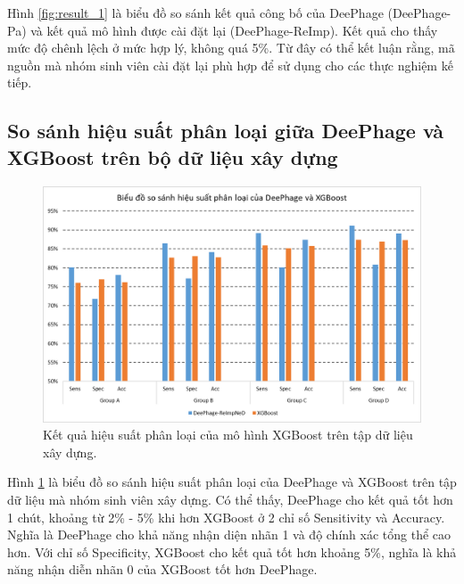 Hình \ref{fig:result_1} là biểu đồ so sánh kết quả công bố của DeePhage (DeePhage-Pa) và kết quả mô hình được cài đặt lại (DeePhage-ReImp). Kết quả cho thấy mức độ chênh lệch ở mức hợp lý, không quá 5\%. Từ đây có thể kết luận rằng, mã nguồn mà nhóm sinh viên cài đặt lại phù hợp để sử dụng cho các thực nghiệm kế tiếp.

\subsection{So sánh hiệu suất phân loại giữa DeePhage và XGBoost trên bộ dữ liệu xây dựng}

\begin{figure}[H]
    \centering
    \includegraphics[width=1\linewidth]{figures/result_deephage_vs_xgboost.png}
    \caption{Kết quả hiệu suất phân loại của mô hình XGBoost trên tập dữ liệu xây dựng.}
    \label{fig:result_2}
\end{figure}

Hình \ref{fig:result_2} là biểu đồ so sánh hiệu suất phân loại của DeePhage và XGBoost trên tập dữ liệu mà nhóm sinh viên xây dựng. Có thể thấy, DeePhage cho kết quả tốt hơn 1 chút, khoảng từ 2\% - 5\% khi hơn XGBoost ở 2 chỉ số Sensitivity và Accuracy. Nghĩa là DeePhage cho khả năng nhận diện nhãn 1 và độ chính xác tổng thể cao hơn. Với chỉ số Specificity, XGBoost cho kết quả tốt hơn khoảng 5\%, nghĩa là khả năng nhận diễn nhãn 0 của XGBoost tốt hơn DeePhage.

